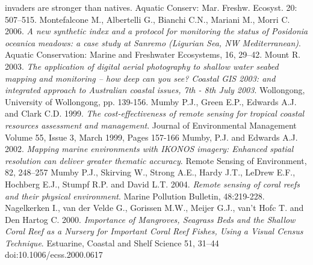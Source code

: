 \documentclass[11pt]{article}
\begin{document}
\begin{thebibliography}{999}
{invaders are stronger than natives}. Aquatic Conserv: Mar. Freshw. Ecosyst. 20: 507–515. \pageref{Montefalcone10}
Montefalcone M., Albertelli G., Bianchi C.N., Mariani M., Morri C. 2006. \emph{A new synthetic index and a protocol for monitoring the status of \textit{{Posidonia oceanica}} meadows: a case study at Sanremo (Ligurian Sea, NW Mediterranean)}. Aquatic Conservation: Marine and Freshwater Ecosystems, 16, 29–42. \pageref{Montefalcone06}
Mount R. 2003. \emph{The application of digital aerial photography to shallow water seabed
mapping and monitoring – how deep can you see? Coastal GIS 2003: and integrated approach to Australian coastal issues, 7th - 8th July 2003}. Wollongong, University of Wollongong, pp. 139-156. \pageref{Mount03}
Mumby P.J., Green E.P., Edwards A.J. and Clark C.D. 1999. \emph{The cost-effectiveness of remote sensing for tropical coastal resources assessment and management}. Journal of Environmental Management Volume 55, Issue 3, March 1999, Pages 157-166 \pageref{Mumby99}
Mumby, P.J. and Edwards A.J. 2002. \emph{Mapping marine environments with IKONOS
imagery: Enhanced spatial resolution can deliver greater thematic accuracy}. Remote Sensing of Environment, 82, 248–257 \pageref{Mumby02}
Mumby P.J., Skirving W., Strong A.E., Hardy J.T., LeDrew E.F., Hochberg E.J., Stumpf R.P. and David L.T. 2004. \emph{Remote sensing of coral reefs and their physical environment}. Marine Pollution Bulletin, 48:219-228. \pageref{Mumby04}
Nagelkerken I., van der Velde G., Gorissen M.W., Meijer G.J., van’t Hofc T. and Den Hartog C. 2000. \emph{Importance of Mangroves, Seagrass Beds and the Shallow Coral Reef as a Nursery for Important Coral Reef Fishes, Using a Visual Census Technique}. Estuarine,
Coastal and Shelf Science 51, 31–44 doi:10.1006/ecss.2000.0617 \pageref{Nagelkerken00}

\end{thebibliography}
\end{document}
